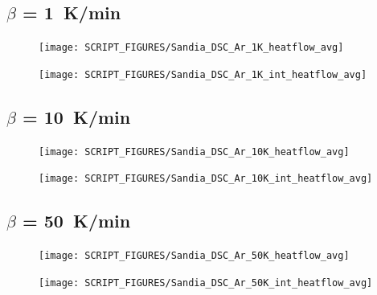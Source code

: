 \documentclass{book}
\begin{document}
\begin{landscape}
\subsection{$\beta$ = 1~K/min}
\begin{minipage}{0.65\textwidth}
\begin{figure}[H]
{\texttt{[image: SCRIPT\_FIGURES/Sandia\_DSC\_Ar\_1K\_heatflow\_avg]}}\\
\end{figure}
\end{minipage} 
\begin{minipage}{0.35\textwidth}
\begin{figure}[H]
{\texttt{[image: SCRIPT\_FIGURES/Sandia\_DSC\_Ar\_1K\_int\_heatflow\_avg]}}\\
\end{figure}
\end{minipage}
\vfill

\subsection{$\beta$ = 10~K/min}
\begin{minipage}{0.65\textwidth}
\begin{figure}[H]
{\texttt{[image: SCRIPT\_FIGURES/Sandia\_DSC\_Ar\_10K\_heatflow\_avg]}}\\
\end{figure}
\end{minipage} 
\begin{minipage}{0.35\textwidth}
\begin{figure}[H]
{\texttt{[image: SCRIPT\_FIGURES/Sandia\_DSC\_Ar\_10K\_int\_heatflow\_avg]}}\\
\end{figure}
\end{minipage}

\newpage
\subsection{$\beta$ = 50~K/min}
\begin{minipage}{0.65\textwidth}
\begin{figure}[H]
{\texttt{[image: SCRIPT\_FIGURES/Sandia\_DSC\_Ar\_50K\_heatflow\_avg]}}\\
\end{figure}
\end{minipage} 
\begin{minipage}{0.35\textwidth}
\begin{figure}[H]
{\texttt{[image: SCRIPT\_FIGURES/Sandia\_DSC\_Ar\_50K\_int\_heatflow\_avg]}}\\
\end{figure}
\end{minipage}
\vfill


\end{landscape}
\end{document}
